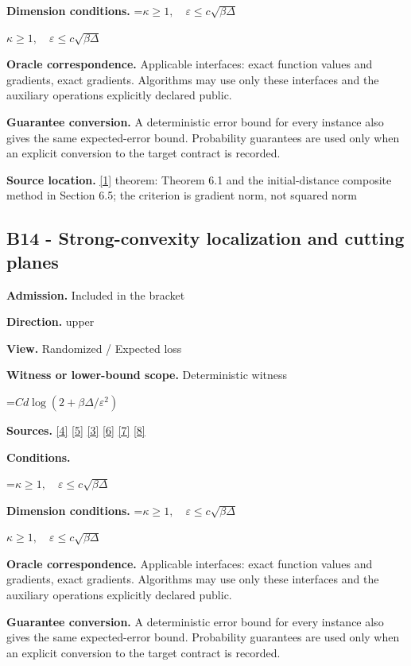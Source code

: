 \documentclass[10pt,a4paper]{article}
\newcommand{\AtlasMath}[1]{\par\begingroup\centering\setbox0=\hbox{$\displaystyle #1$}\ifdim\wd0>1.4\linewidth\typeout{ATLAS WIDE FORMULA: \the\wd0}\fi\ifdim\wd0>\linewidth\resizebox{\linewidth}{!}{\box0}\else\box0\fi\par\endgroup}
\newcommand{\AtlasInlineMath}[1]{\begingroup\setbox0=\hbox{$#1$}\ifdim\wd0>.4\linewidth\endgroup\AtlasMath{#1}\else\endgroup$#1$\fi}
\begin{document}
\textbf{Dimension conditions.} \AtlasInlineMath{\kappa\ge1,\quad\varepsilon\le c\sqrt{\beta\Delta}}

\textbf{Oracle correspondence.} Applicable interfaces: exact function values and gradients, exact gradients. Algorithms may use only these interfaces and the auxiliary operations explicitly declared public.

\textbf{Guarantee conversion.} A deterministic error bound for every instance also gives the same expected-error bound. Probability guarantees are used only when an explicit conversion to the target contract is recorded.

\textbf{Source location.} \href{https://arxiv.org/pdf/1803.06600v4}{[1]} theorem: Theorem 6.1 and the initial-distance composite method in Section 6.5; the criterion is gradient norm, not squared norm

\subsection{B14 - Strong-convexity localization and cutting planes}
\textbf{Admission.} Included in the bracket

\textbf{Direction.} upper

\textbf{View.} Randomized / Expected loss

\textbf{Witness or lower-bound scope.} Deterministic witness

\AtlasMath{Cd\log(2+\beta\Delta/\varepsilon^2)}
\textbf{Sources.} \href{https://arxiv.org/pdf/2101.09740v2}{[4]} \href{https://arxiv.org/pdf/2609.33360v2}{[5]} \href{https://arxiv.org/pdf/2609.10874}{[3]} \href{https://arxiv.org/pdf/1405.4980}{[6]} \href{https://www2.isye.gatech.edu/~nemirovs/MOR_AccuracyCertificates.pdf}{[7]} \href{https://arxiv.org/pdf/2609.20701}{[8]}

\textbf{Conditions.} 
\AtlasMath{\kappa\ge1,\quad\varepsilon\le c\sqrt{\beta\Delta}}


\textbf{Dimension conditions.} \AtlasInlineMath{\kappa\ge1,\quad\varepsilon\le c\sqrt{\beta\Delta}}

\textbf{Oracle correspondence.} Applicable interfaces: exact function values and gradients, exact gradients. Algorithms may use only these interfaces and the auxiliary operations explicitly declared public.

\textbf{Guarantee conversion.} A deterministic error bound for every instance also gives the same expected-error bound. Probability guarantees are used only when an explicit conversion to the target contract is recorded.
\end{document}
